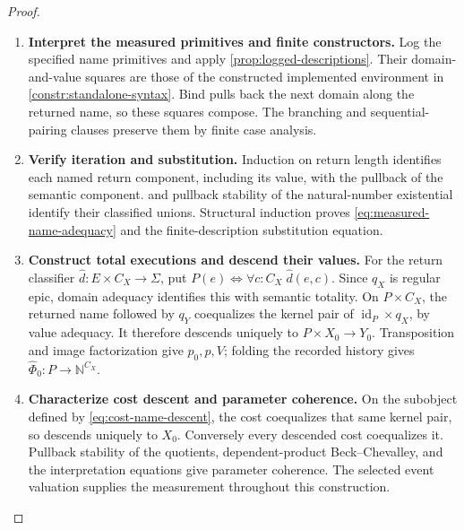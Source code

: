 \documentclass[11pt,a4paper]{article}
\numberwithin{algorithm}{section}
\numberwithin{equation}{section}
\theoremstyle{definition}
\theoremstyle{remark}
\theoremstyle{plain}
\newcommand{\N}{\mathbb N}
\newcommand{\id}{\operatorname{id}}
\theoremstyle{definition}
\theoremstyle{plain}
\begin{document}
\begin{proof}\leavevmode
\begin{enumerate}[leftmargin=*,align=left]
\item \textbf{Interpret the measured primitives and finite constructors.}
Log the specified name primitives and apply
\cref{prop:logged-descriptions}. Their domain-and-value squares are those of the constructed
implemented environment in \cref{constr:standalone-syntax}.
Bind pulls back the next domain along the returned name, so
these squares compose. The branching and sequential-pairing
clauses preserve them by finite case analysis.

\item \textbf{Verify iteration and substitution.}
Induction on return length identifies each named return component,
including its value, with the pullback of the semantic component.
 and pullback stability of the
natural-number existential identify their classified unions.
Structural induction proves \eqref{eq:measured-name-adequacy}
and the finite-description substitution equation.

\item \textbf{Construct total executions and descend their values.}
For the return classifier $\widehat d:E\times C_X\to\Sigma$, put
$P(e)\iff\forall c:C_X\;\widehat d(e,c)$.
Since $q_X$ is regular epic, domain adequacy identifies this with
semantic totality. On $P\times C_X$, the returned name followed
by $q_Y$ coequalizes the kernel pair of $\id_P\times q_X$,
by value adequacy. It therefore descends uniquely to
$P\times X_0\to Y_0$. Transposition and image factorization
give $p_0,p,V$; folding the recorded history gives
$\widehat\Phi_0:P\to\N^{C_X}$.

\item \textbf{Characterize cost descent and parameter coherence.}
On the subobject defined by \eqref{eq:cost-name-descent}, the cost
coequalizes that same kernel pair, so descends uniquely to $X_0$.
Conversely every descended cost coequalizes it.
Pullback stability of the quotients, dependent-product
Beck--Chevalley, and the interpretation equations give parameter
coherence. The selected event valuation supplies the measurement
throughout this construction.
\end{enumerate}
\end{proof}
\end{document}

